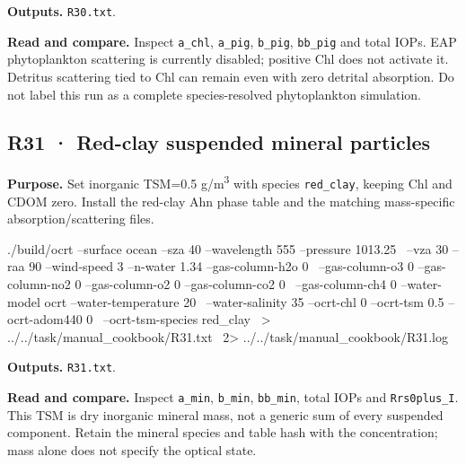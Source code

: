 \textbf{Outputs. }\texttt{R30.txt}.

\textbf{Read and compare. }Inspect \texttt{a\_\allowbreak{}chl}, \texttt{a\_\allowbreak{}pig}, \texttt{b\_\allowbreak{}pig}, \texttt{bb\_\allowbreak{}pig} and total IOPs. EAP phytoplankton scattering is currently disabled; positive Chl does not activate it. Detritus scattering tied to Chl can remain even with zero detrital absorption. Do not label this run as a complete species-resolved phytoplankton simulation.


\subsection{R31 · Red-clay suspended mineral particles}
\label{sec:auto:09_cookbook:6.6}

\label{recipe:R31}

\textbf{Purpose. }Set inorganic TSM=0.5 g/m\textsuperscript{3} with species \texttt{red\_\allowbreak{}clay}, keeping Chl and CDOM zero. Install the red-clay Ahn phase table and the matching mass-specific absorption/scattering files.

\noindent\begin{minipage}{\linewidth}
\begin{ManualCode}

./build/ocrt --surface ocean --sza 40 --wavelength 555 --pressure 1013.25 \
  --vza 30 --raa 90 --wind-speed 3 --n-water 1.34 --gas-column-h2o 0 \
  --gas-column-o3 0 --gas-column-no2 0 --gas-column-o2 0 --gas-column-co2 0 \
  --gas-column-ch4 0 --water-model ocrt --water-temperature 20 \
  --water-salinity 35 --ocrt-chl 0 --ocrt-tsm 0.5 --ocrt-adom440 0 \
  --ocrt-tsm-species red_clay \
  > ../../task/manual_cookbook/R31.txt \
  2> ../../task/manual_cookbook/R31.log

\end{ManualCode}
\end{minipage}\par

\textbf{Outputs. }\texttt{R31.txt}.

\textbf{Read and compare. }Inspect \texttt{a\_\allowbreak{}min}, \texttt{b\_\allowbreak{}min}, \texttt{bb\_\allowbreak{}min}, total IOPs and \texttt{Rrs0plus\_\allowbreak{}I}. This TSM is dry inorganic mineral mass, not a generic sum of every suspended component. Retain the mineral species and table hash with the concentration; mass alone does not specify the optical state.

